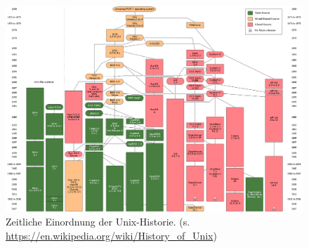 \documentclass[xcolor=dvipsnames,aspectratio=169]{beamer}
\begin{document}
\begin{frame}
\begin{figure}
\centering
 \vspace*{-.2
 cm} 
\includegraphics[scale=0.18]{unix_hist}
\caption{Zeitliche Einordnung der Unix-Historie. (s. \url{https://en.wikipedia.org/wiki/History_of_Unix}) }
\end{figure}
\end{frame}
\end{document}
